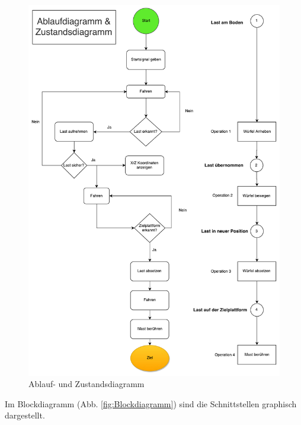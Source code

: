\documentclass[a4paper]{report}
\begin{document}
\begin{figure}[h!]
	\includegraphics[keepaspectratio,width=\textwidth]{Ablaufdiagramm}
	\caption{Ablauf- und Zustandsdiagramm}
	\label{fig:Ablaufdiagramm}
\end{figure}

\newpage
Im Blockdiagramm (Abb. \ref{fig:Blockdiagramm}) sind die Schnittstellen graphisch dargestellt.
\end{document}
